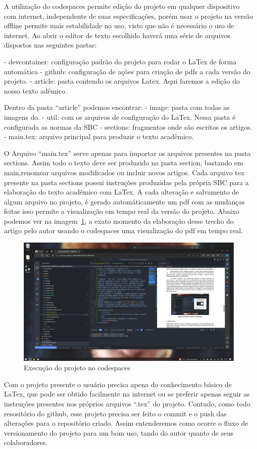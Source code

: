 A utilização do codespaces permite edição do projeto em qualquer dispositivo com internet, independente de suas especificações, porém usar o projeto na versão offline permite mais estabilidade no uso, visto que não é necessário o uso de internet.
Ao abrir o editor de texto escolhido haverá uma série de arquivos dispostos nas seguintes pastas:

- devcontainer: configuração padrão do projeto para rodar o LaTex de forma automática
- github: configuração de ações para criação de pdfs a cada versão do projeto.
- article: pasta contendo os arquivos Latex. Aqui faremos a edição do nosso texto adêmico.

Dentro da pasta ``article'' podemos encontrar:
- image: pasta com todas as imagens do.
- util: com os arquivos de configuração do LaTex. Nessa pasta é configurada as normas da SBC
- sections: fragmentos onde são escritos os artigos.
- main.tex: arquivo principal para produzir o texto acadêmico.

O Arquivo ``main.tex'' serve apenas para importar os arquivos presentes na pasta sections. Assim todo o texto deve ser produzido na pasta section, bastando em main,renomear arquivos modificados ou incluir novos artigos. Cada arquivo tex presente na pasta sections possui instruções produzidas pela própria SBC para a elaboração do texto acadêmico com LaTex.
A cada alteração e salvamento de algum arquivo no projeto, é gerado automáticamente um pdf com as mudanças feitas isso permite a visualização em tempo real da versão do projeto.
Abaixo podemos ver na imagem~\ref{fig:image05}, a exato momento da elaboração desse trecho do artigo pelo autor usando o codespaces uma visualização do pdf em tempo real.

\begin{figure}[ht]
	\centering
	\includegraphics[width=.8\textwidth]{./images/image05.png}
	\caption{Execução do projeto no codespaces}
	\label{fig:image05}
\end{figure}

Com o projeto presente o usuário precisa apena do conhecimento básico de LaTex, que pode ser obtido facilmente na internet ou se preferir apenas seguir as instruções presentes nos próprios arquivos ``.tex'' do projeto.
Contudo, como todo resositório do github, esse projeto precisa ser feito o commit e o push das alterações para o repositório criado. Assim entenderemos como ocorre o fluxo de versionamento do projeto para um bom uso, tando do autor quanto de seus colaboradores.